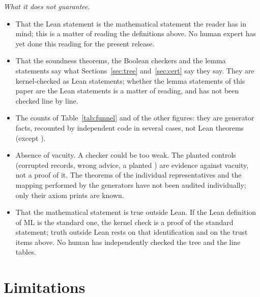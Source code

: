 \documentclass[11pt]{article}
\theoremstyle{remark}
\newcommand{\ML}{\mathrm{ML}}
\begin{document}
\emph{What it does not guarantee.}
\begin{itemize}
\item That the Lean statement is the mathematical statement the reader has in mind; this is a matter of reading the definitions above. No human expert has yet done this reading for the present release.
\item That the soundness theorems, the Boolean checkers and the lemma statements say what Sections~\ref{sec:tree} and~\ref{sec:cert} say they say. They are kernel-checked as Lean statements; whether the lemma statements of this paper are the Lean statements is a matter of reading, and has not been checked line by line.
\item The counts of Table~\ref{tab:funnel} and of the other figures: they are generator facts, recounted by independent code in several cases, not Lean theorems (except ).
\item Absence of vacuity. A checker could be too weak. The planted controls (corrupted records, wrong advice, a planted ) are evidence against vacuity, not a proof of it. The theorems  of the individual representatives and the mapping performed by the generators have not been audited individually; only their axiom prints are known.
\item That the mathematical statement is true outside Lean. If the Lean definition of $\ML$ is the standard one, the kernel check is a proof of the standard statement; truth outside Lean rests on that identification and on the trust items above. No human has independently checked the tree and the line tables.
\end{itemize}

\section{Limitations}\label{sec:limits}
\end{document}
